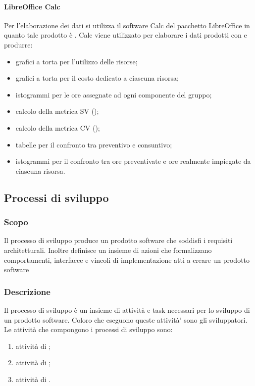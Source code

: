 \documentclass[12pt,a4paper]{article}
\begin{document}

\paragraph{LibreOffice Calc}
Per l’elaborazione dei dati si utilizza il software Calc del pacchetto LibreOffice in quanto tale prodotto è . Calc viene utilizzato per elaborare i dati prodotti con  e produrre:
\begin{itemize}
	\item grafici a torta per l’utilizzo delle risorse;
	\item grafici a torta per il costo dedicato a ciascuna risorsa;
	\item istogrammi per le ore assegnate ad ogni componente del gruppo;
	\item calcolo della metrica SV ();
	\item calcolo della metrica CV ();
	\item tabelle per il confronto tra preventivo e consuntivo;
	\item istogrammi per il confronto tra ore preventivate e ore realmente impiegate da
	ciascuna risorsa.
\end{itemize}

\subsection{Processi di sviluppo}

\subsubsection{Scopo}
Il processo di sviluppo produce un prodotto software che soddisfi i requisiti architetturali. Inoltre definisce un insieme di azioni che formalizzano comportamenti, interfacce e vincoli di implementazione atti a creare un prodotto software

\subsubsection{Descrizione}
Il processo di sviluppo è un insieme di attività e task necessari per lo sviluppo di un prodotto software. Coloro che eseguono queste attività' sono gli sviluppatori. Le attività che compongono i processi di sviluppo sono:
\begin{enumerate}
	\item attività di \FA;
	\item attività di \FPA;
	\item attività di \FPDC.
\end{enumerate}
\end{document}
